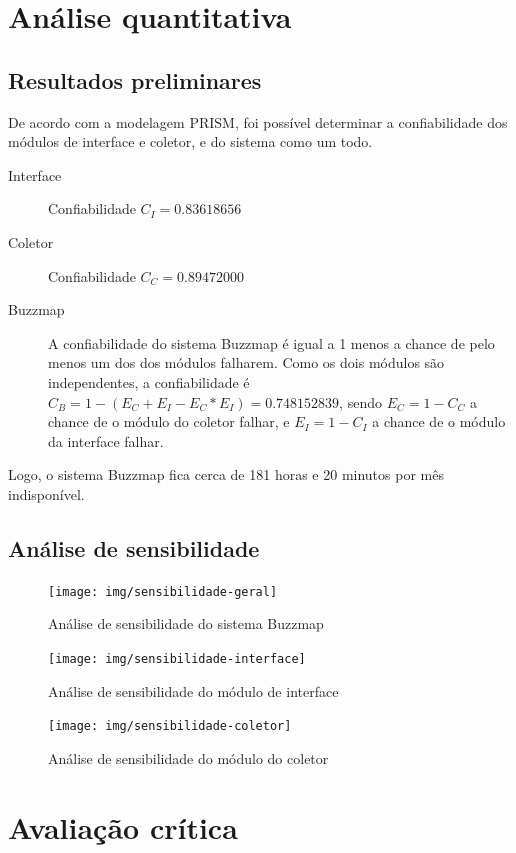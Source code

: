 \section{Análise quantitativa}
\subsection{Resultados preliminares}
De acordo com a modelagem PRISM, foi possível determinar a
confiabilidade dos módulos de interface e coletor, e do sistema como
um todo.
\begin{description}
\item[Interface] Confiabilidade $C_I = 0.83618656$
\item[Coletor] Confiabilidade $C_C = 0.89472000$
\item[Buzzmap] A confiabilidade do sistema Buzzmap é igual a 1 menos a
chance de pelo menos um dos dos módulos falharem. Como os dois módulos
são independentes, a confiabilidade é $C_B = 1 - (E_C+E_I-E_C*E_I) = 0.748152839$,
    sendo $E_C = 1 - C_C$ a chance de o módulo do coletor falhar, e
    $E_I = 1 - C_I$ a chance de o módulo da interface falhar.
\end{description}

Logo, o sistema Buzzmap fica cerca de 181 horas e 20 minutos por mês
indisponível.


\subsection{Análise de sensibilidade}

\begin{figure}[htbp]
\centering
\texttt{[image: img/sensibilidade-geral]}
\caption{Análise de sensibilidade do sistema Buzzmap}
\label{fig:sensibilidade-geral}
\end{figure}

\begin{figure}[htbp]
\centering
\texttt{[image: img/sensibilidade-interface]}
\caption{Análise de sensibilidade do módulo de interface}
\label{fig:sensibilidade-interface}
\end{figure}

\begin{figure}[htbp]
\centering
\texttt{[image: img/sensibilidade-coletor]}
\caption{Análise de sensibilidade do módulo do coletor}
\label{fig:sensibilidade-coletor}
\end{figure}

\section{Avaliação crítica}

